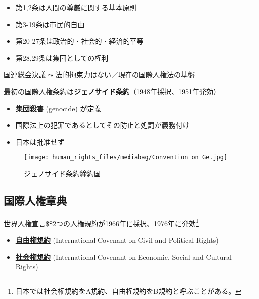 \documentclass[
  xelatex,
  ja=standard]{bxjsarticle}
\providecommand{\tightlist}{%
  \setlength{\itemsep}{0pt}\setlength{\parskip}{0pt}}\usepackage{longtable,booktabs,array}
\begin{document}
\begin{itemize}
\tightlist
\item
  第1,2条は人間の尊厳に関する基本原則
\item
  第3-19条は市民的自由
\item
  第20-27条は政治的・社会的・経済的平等
\item
  第28,29条は集団としての権利
\end{itemize}

国連総会決議\(\leadsto\)法的拘束力はない／現在の国際人権法の基盤

最初の国際人権条約は\href{https://worldjpn.grips.ac.jp/documents/texts/mt/19481209.T1J.html}{\textbf{ジェノサイド条約}}（1948年採択、1951年発効）

\begin{itemize}
\tightlist
\item
  \textbf{集団殺害} (genocide) が定義
\item
  国際法上の犯罪であるとしてその防止と処罰が義務付け
\item
  日本は批准せず
\end{itemize}

\begin{figure}[htpb]

{\centering \texttt{[image: human\_rights\_files/mediabag/Convention on Ge.jpg]}

}

\caption{\href{https://www.un.org/en/genocideprevention/genocide-convention.shtml}{ジェノサイド条約締約国}}

\end{figure}

\hypertarget{ux56fdux969bux4ebaux6a29ux7ae0ux5178}{%
\subsection{国際人権章典}\label{ux56fdux969bux4ebaux6a29ux7ae0ux5178}}

世界人権宣言\$\leadsto\$2つの人権規約が1966年に採択、1976年に発効\footnote{日本では社会権規約をA規約、自由権規約をB規約と呼ぶことがある。}

\begin{itemize}
\tightlist
\item
  \href{https://www.nichibenren.or.jp/activity/international/library/human_rights/liberty_convention.html}{\textbf{自由権規約}}
  (International Covenant on Civil and Political Rights)
\item
  \href{https://www.nichibenren.or.jp/activity/international/library/human_rights/society_convention.html}{\textbf{社会権規約}}
  (International Covenant on Economic, Social and Cultural Rights)
\end{itemize}
\end{document}
